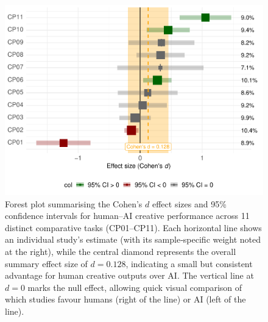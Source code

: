 \documentclass[acmsmall,authorversion]{acmart}
\begin{document}
\begin{figure}[H]
  \centering
  \includegraphics[width=\linewidth]{plot_performance_forest}
  \caption{Forest plot summarising the Cohen’s $d$ effect sizes and 95\% confidence intervals for human–AI creative performance across 11 distinct comparative tasks (CP01–CP11). Each horizontal line shows an individual study’s estimate (with its sample‐specific weight noted at the right), while the central diamond represents the overall summary effect size of $d = 0.128$, indicating a small but consistent advantage for human creative outputs over AI. The vertical line at $d=0$ marks the null effect, allowing quick visual comparison of which studies favour humans (right of the line) or AI (left of the line).}
  \label{fig:performance_forest}
\end{figure}
\end{document}
